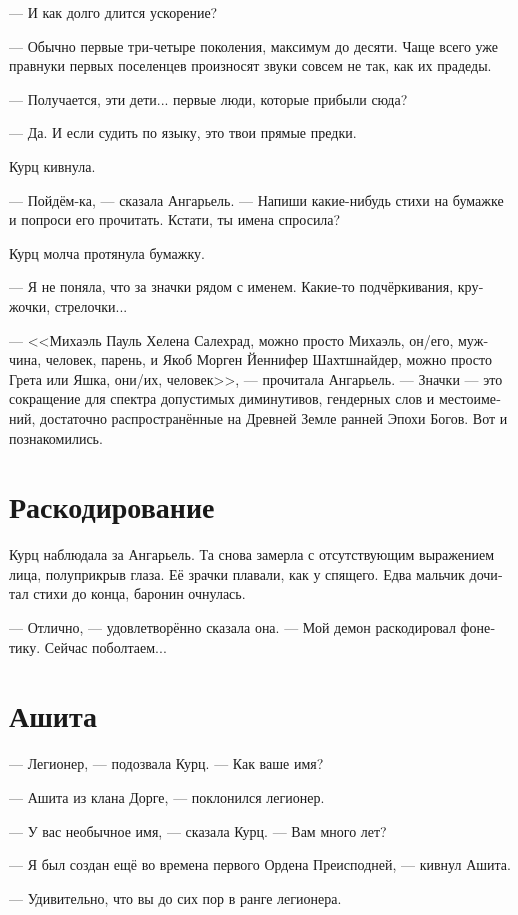 \documentclass[a4paper,12pt,fleqn]{book}\usepackage{cooltooltips}\usepackage{polyglossia}\setdefaultlanguage[babelshorthands=true]{russian}\setotherlanguage{english}\defaultfontfeatures{Ligatures=TeX,Mapping=tex-text} \usepackage{xcolor}\definecolor{lightgray}{HTML}{bbbbbb}\color{lightgray}\newcommand{\ml}[3]{\textenglish{\textcolor{black}{#3}}}
\begin{document}
--- И как долго длится ускорение?

--- Обычно первые три-четыре поколения, максимум до десяти.
Чаще всего уже правнуки первых поселенцев произносят звуки совсем не так, как их прадеды.

--- Получается, эти дети... первые люди, которые прибыли сюда?

--- Да.
И если судить по языку, это твои прямые предки.

Курц кивнула.

--- Пойдём-ка, --- сказала Ангарьель.
--- Напиши какие-нибудь стихи на бумажке и попроси его прочитать.
Кстати, ты имена спросила?

Курц молча протянула бумажку.

--- Я не поняла, что за значки рядом с именем.
Какие-то подчёркивания, кружочки, стрелочки...

--- <<Михаэль Пауль Хелена Салехрад, можно просто Михаэль, он/его, мужчина, человек, парень, и Якоб Морген Йеннифер Шахтшнайдер, можно просто Грета или Яшка, они/их, человек>>, --- прочитала Ангарьель.
--- Значки --- это сокращение для спектра допустимых диминутивов, гендерных слов и местоимений, достаточно распространённые на Древней Земле ранней Эпохи Богов.
Вот и познакомились.

\section{Раскодирование}

Курц наблюдала за Ангарьель.
Та снова замерла с отсутствующим выражением лица, полуприкрыв глаза.
Её зрачки плавали, как у спящего.
Едва мальчик дочитал стихи до конца, баронин очнулась.

--- Отлично, --- удовлетворённо сказала она.
--- Мой демон раскодировал фонетику.
Сейчас поболтаем...

\section{Ашита}

--- Легионер, --- подозвала Курц.
--- Как ваше имя?

--- Ашита из клана Дорге, --- поклонился легионер.

--- У вас необычное имя, --- сказала Курц.
--- Вам много лет?

--- Я был создан ещё во времена первого Ордена Преисподней, --- кивнул Ашита.

--- Удивительно, что вы до сих пор в ранге легионера.
\end{document}
